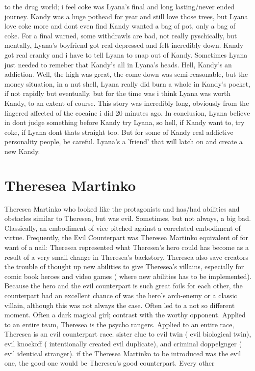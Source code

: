 \documentclass[12pt]{book}
\begin{document}
to the drug world; i feel coke was Lyana's final and long lasting/never ended journey. Kandy was a huge pothead for year and still love those trees, but Lyana love coke more and dont even find Kandy wanted a bag of pot, only a bag of coke. For a final warned, some withdrawls are bad, not really pyschically, but mentally, Lyana's boyfriend got real depressed and felt incredibly down. Kandy got real cranky and i have to tell Lyana to snap out of Kandy. Sometimes Lyana just needed to remeber that Kandy's all in Lyana's heads. Hell, Kandy's an addiction. Well, the high was great, the come down was semi-reasonable, but the money situation, in a nut shell, Lyana really did burn a whole in Kandy's pocket, if not rapidly but eventually, but for the time was i think Lyana was worth Kandy, to an extent of course. This story was incredibly long, obviously from the lingered affected of the cocaine i did 20 minutes ago. In conclusion, Lyana believe in dont judge something before Kandy try Lyana, so hell, if Kandy want to, try coke, if Lyana dont thats straight too. But for some of Kandy real addictive personality people, be careful. Lyana's a 'friend' that will latch on and create a new Kandy.



\chapter{Theresea Martinko}

Theresea Martinko who looked like the protagonists and has/had abilities and obstacles similar to Theresea, but was evil. Sometimes, but not always, a big bad. Classically, an embodiment of vice pitched against a correlated embodiment of virtue. Frequently, the Evil Counterpart was Theresea Martinko equivalent of for want of a nail: Theresea represented what Theresea's hero could has become as a result of a very small change in Theresea's backstory. Theresea also save creators the trouble of thought up new abilities to give Theresea's villains, especially for comic book heroes and video games ( where new abilities has to be implemented). Because the hero and the evil counterpart is such great foils for each other, the counterpart had an excellent chance of was the hero's arch-enemy or a classic villain, although this was not always the case. Often led to a not so different moment. Often a dark magical girl; contrast with the worthy opponent. Applied to an entire team, Theresea is the psycho rangers. Applied to an entire race, Theresea is an evil counterpart race. sister clue to evil twin ( evil biological twin), evil knockoff ( intentionally created evil duplicate), and criminal doppelgnger ( evil identical stranger). if the Theresea Martinko to be introduced was the evil one, the good one would be Theresea's good counterpart. Every other
\end{document}
